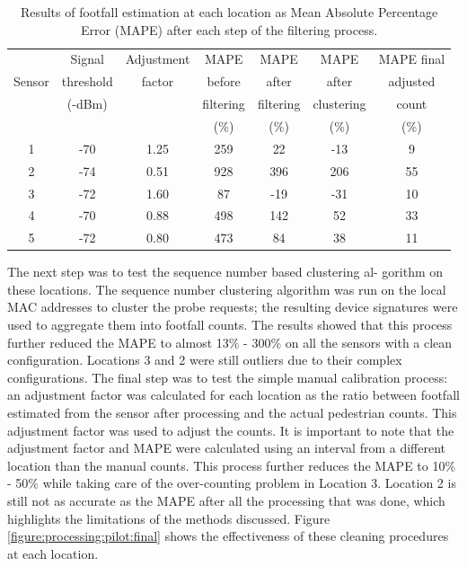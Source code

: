 \begin{centering}
\begin{table}
\footnotesize
\caption{Results of footfall estimation at each location as Mean Absolute Percentage Error (MAPE) after each step of the filtering process.}
{\begin{tabular}{ccccccc} 
\toprule
& Signal    & Adjustment & MAPE      & MAPE      & MAPE       & MAPE final \\
Sensor  & threshold & factor     & before    & after     & after    & adjusted\\
& (-dBm)    &            & filtering & filtering & clustering & count\\
&           &            & (\%)      & (\%)      & (\%)       & (\%)\\
\midrule
1 & -70 & 1.25 & 259 &  22 & -13 &  9 \\
2 & -74 & 0.51 & 928 & 396 & 206 & 55 \\
3 & -72 & 1.60 &  87 & -19 & -31 & 10 \\
4 & -70 & 0.88 & 498 & 142 &  52 & 33 \\
5 & -72 & 0.80 & 473 &  84 &  38 & 11 \\
\bottomrule
\end{tabular}}
\label{table:processing:pilot:results}
\end{table}
\end{centering}

The next step was to test the sequence number based clustering al- gorithm on these locations.
The sequence number clustering algorithm was run on the local MAC addresses to cluster the probe requests; the resulting device signatures were used to aggregate them into footfall counts.
The results showed that this process further reduced the MAPE to almost 13\% - 300\% on all the sensors with a clean configuration.
Locations 3 and 2 were still outliers due to their complex configurations.
The final step was to test the simple manual calibration process: an adjustment factor was calculated for each location as the ratio between footfall estimated from the sensor after processing and the actual pedestrian counts.
This adjustment factor was used to adjust the counts.
It is important to note that the adjustment factor and MAPE were calculated using an interval from a different location than the manual counts.
This process further reduces the MAPE to 10\% - 50\% while taking care of the over-counting problem in Location 3.
Location 2 is still not as accurate as the MAPE after all the processing that was done, which highlights the limitations of the methods discussed.
Figure \ref{figure:processing:pilot:final} shows the effectiveness of these cleaning procedures at each location.

